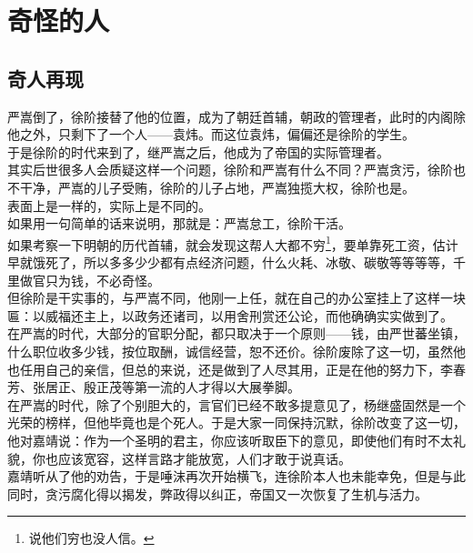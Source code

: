 \section{奇怪的人}
\ifnum{}
	\begin{multicols}{\theparacolNo}
\fi
\subsection{奇人再现}
严嵩倒了，徐阶接替了他的位置，成为了朝廷首辅，朝政的管理者，此时的内阁除他之外，只剩下了一个人——袁炜。而这位袁炜，偏偏还是徐阶的学生。\\

于是徐阶的时代来到了，继严嵩之后，他成为了帝国的实际管理者。\\

其实后世很多人会质疑这样一个问题，徐阶和严嵩有什么不同？严嵩贪污，徐阶也不干净，严嵩的儿子受贿，徐阶的儿子占地，严嵩独揽大权，徐阶也是。\\

表面上是一样的，实际上是不同的。\\

如果用一句简单的话来说明，那就是：严嵩怠工，徐阶干活。\\

如果考察一下明朝的历代首辅，就会发现这帮人大都不穷\footnote{说他们穷也没人信。}，要单靠死工资，估计早就饿死了，所以多多少少都有点经济问题，什么火耗、冰敬、碳敬等等等等，千里做官只为钱，不必奇怪。\\

但徐阶是干实事的，与严嵩不同，他刚一上任，就在自己的办公室挂上了这样一块匾：以威福还主上，以政务还诸司，以用舍刑赏还公论，而他确确实实做到了。\\

在严嵩的时代，大部分的官职分配，都只取决于一个原则——钱，由严世蕃坐镇，什么职位收多少钱，按位取酬，诚信经营，恕不还价。徐阶废除了这一切，虽然他也任用自己的亲信，但总的来说，还是做到了人尽其用，正是在他的努力下，李春芳、张居正、殷正茂等第一流的人才得以大展拳脚。\\

在严嵩的时代，除了个别胆大的，言官们已经不敢多提意见了，杨继盛固然是一个光荣的榜样，但他毕竟也是个死人。于是大家一同保持沉默，徐阶改变了这一切，他对嘉靖说：作为一个圣明的君主，你应该听取臣下的意见，即使他们有时不太礼貌，你也应该宽容，这样言路才能放宽，人们才敢于说真话。\\

嘉靖听从了他的劝告，于是唾沫再次开始横飞，连徐阶本人也未能幸免，但是与此同时，贪污腐化得以揭发，弊政得以纠正，帝国又一次恢复了生机与活力。\\


\end{multicols}
